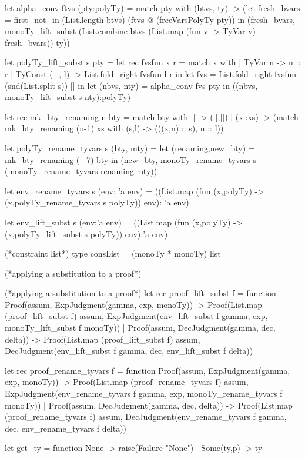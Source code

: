 let alpha_conv ftvs (pty:polyTy) =
    match pty with (btvs, ty) ->
    (let fresh_bvars =
         first_not_in (List.length btvs) (ftvs @ (freeVarsPolyTy pty))
     in (fresh_bvars,
         monoTy_lift_subst (List.combine btvs (List.map (fun v -> TyVar v) fresh_bvars))
         ty))

let polyTy_lift_subst s pty =
	let rec fvsfun x r = match x with
		| TyVar n -> n :: r
		| TyConst (_, l) -> List.fold_right fvsfun l r
	in
	let fvs = List.fold_right fvsfun (snd(List.split s)) [] in
    let (nbvs, nty) = alpha_conv fvs pty in
    ((nbvs, monoTy_lift_subst s nty):polyTy)

let rec mk_bty_renaming n bty =
    match bty with [] -> ([],[])
    | (x::xs) -> (match mk_bty_renaming (n-1) xs
                   with (s,l) -> (((x,n) :: s), n :: l))

let polyTy_rename_tyvars s (bty, mty) =
    let (renaming,new_bty) = mk_bty_renaming (~-7) bty in
    (new_bty, monoTy_rename_tyvars s (monoTy_rename_tyvars renaming mty))

let env_rename_tyvars s (env: 'a env) =
    ((List.map
      (fun (x,polyTy) -> (x,polyTy_rename_tyvars s polyTy)) env): 'a env)

let env_lift_subst s (env:'a env) =
    ((List.map (fun (x,polyTy) -> (x,polyTy_lift_subst s polyTy)) env):'a env)


(*constraint list*)
type consList = (monoTy * monoTy) list


(*applying a substitution to a proof*)

(*applying a substitution to a proof*)
let rec proof_lift_subst f = function
    Proof(assum, ExpJudgment(gamma, exp, monoTy)) ->
    Proof(List.map (proof_lift_subst f) assum,
          ExpJudgment(env_lift_subst f gamma, exp, monoTy_lift_subst f monoTy))
 | Proof(assum, DecJudgment(gamma, dec, delta)) ->
    Proof(List.map (proof_lift_subst f) assum,
          DecJudgment(env_lift_subst f gamma, dec, env_lift_subst f delta))

let rec proof_rename_tyvars f = function
    Proof(assum, ExpJudgment(gamma, exp, monoTy)) ->
    Proof(List.map (proof_rename_tyvars f) assum,
          ExpJudgment(env_rename_tyvars f gamma, exp,
                      monoTy_rename_tyvars f monoTy))
 | Proof(assum, DecJudgment(gamma, dec, delta)) ->
    Proof(List.map (proof_rename_tyvars f) assum,
          DecJudgment(env_rename_tyvars f gamma, dec,
                      env_rename_tyvars f delta))

let get_ty = function
   None       -> raise(Failure "None")
 | Some(ty,p) -> ty

